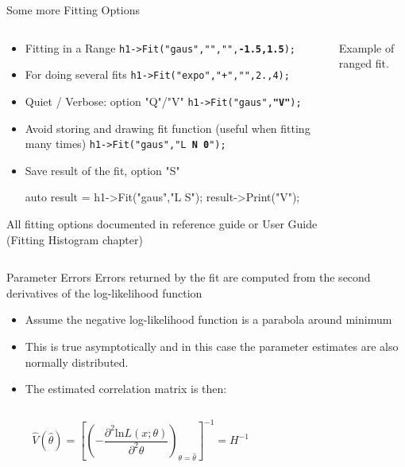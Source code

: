 \documentclass[aspectratio=169]{beamer}
\newcommand{\myterminalinline}[1]{
    \colorbox{terminal-bg}{{\color{terminal-fg}\texttt{#1}}}
}
\newcommand{\emphinlisting}[1]{{\color{terminal-fg-emph}\textbf{#1}}}
\newcommand{\emphlightinlisting}[1]{{\color{terminal-fg-emph}#1}}
\newcommand{\myfigure}[2]{
    \begin{figure}
        \makebox[\textwidth]{%
            \texttt{[image: \#2]}
        }
    \end{figure}
}
\begin{document}
\begin{frame}[fragile]{Some more Fitting Options}

\begin{columns}
\begin{column}{0.52\textwidth}
\begin{itemize}
    \item{Fitting in a Range \myterminalinline{h1->Fit("gaus","","",\emphinlisting{-1.5,1.5});}}
    \item{For doing several ﬁts \myterminalinline{h1->Fit("expo","+","",2.,4);}}
    \item{Quiet / Verbose: option "Q"/"V" \myterminalinline{h1->Fit("gaus",\emphinlisting{"V"});}}
    \item{Avoid storing and drawing ﬁt function (useful when ﬁtting many times) \myterminalinline{h1->Fit("gaus","\emphlightinlisting{L} \emphinlisting{N 0}");}}
    \item{Save result of the ﬁt, option "S"}
        \begin{myterminal}
auto result = h1->Fit("gaus","L S");
result->Print("V");
        \end{myterminal}
\end{itemize}
{\footnotesize All ﬁtting options documented in reference guide or User Guide (Fitting Histogram chapter)}
\end{column}

\begin{column}{0.48\textwidth}
\myfigure{1.0}{figure-010.pdf}
\begin{center}
    {\footnotesize Example of ranged fit.}
\end{center}
\end{column}
\end{columns}

\end{frame}

\begin{frame}[fragile]{Parameter Errors}
Errors returned by the ﬁt are computed from the second derivatives of the
log-likelihood function
\begin{itemize}
    \item{Assume the negative log-likelihood function is a parabola around minimum}
    \item{This is true asymptotically and in this case the parameter estimates are also normally distributed.}
    \item{The estimated correlation matrix is then:}
\end{itemize}
    \vspace{-1cm}
\begin{columns}
\begin{column}{0.57\textwidth}
        $$\hat{V}(\hat{\theta}) = \left[ \left(-\frac{\partial^2\text{ln}L(x;\theta)}{\partial^2\theta}\right)_{\theta=\hat{\theta}} \right]^{-1} = H^{-1}$$
\end{column}
\begin{column}{0.43\textwidth}
    \myfigure{1.00}{figure-009.pdf}
\end{column}
\end{columns}

\end{frame}
\end{document}

